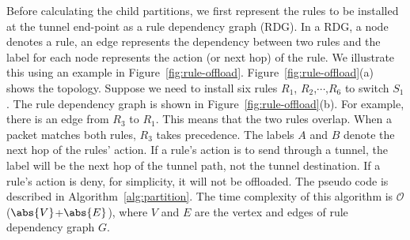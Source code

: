 Before calculating the child partitions, 
we first represent the rules to be installed at the tunnel 
end-point as a rule dependency graph (RDG).  
In a RDG, a node denotes a rule, an edge represents 
the dependency between two rules and the label for 
each node represents the action (or next hop) of the rule. 
We illustrate this using an example in
Figure~\ref{fig:rule-offload}. Figure~\ref{fig:rule-offload}(a) shows the 
topology. Suppose we need to install six rules $R_1$, $R_2$,$\cdots$,$R_6$ to
switch $S_1$. The rule dependency graph is shown in Figure~\ref{fig:rule-offload}(b).
For example, there is an edge from $R_3$ to
$R_1$. This means that the two rules overlap. When a packet matches both rules,
$R_3$ takes precedence. The labels $A$ and $B$ denote the next hop of the
rules' action. If a rule's action is to send through a tunnel, the label will be
the next hop of the tunnel path, not the tunnel destination.  If a rule's action
is deny, for simplicity, it will not be offloaded. The pseudo code is 
described in Algorithm~\ref{alg:partition}. The time complexity of this algorithm is 
 $\mathcal{O}$($\abs{V}$+$\abs{E}$), where $V$ and $E$ are the 
vertex and edges of rule dependency graph $G$. 

